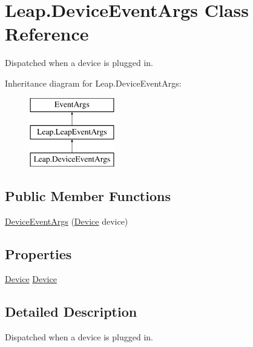 \hypertarget{class_leap_1_1_device_event_args}{}\section{Leap.\+Device\+Event\+Args Class Reference}
\label{class_leap_1_1_device_event_args}


Dispatched when a device is plugged in.  


Inheritance diagram for Leap.\+Device\+Event\+Args\+:\begin{figure}[H]
\begin{center}
\leavevmode
\includegraphics[height=3.000000cm]{class_leap_1_1_device_event_args}
\end{center}
\end{figure}
\subsection*{Public Member Functions}
\begin{DoxyCompactItemize}
\item 
\mbox{\hyperlink{class_leap_1_1_device_event_args_a3c4a894a009ac62e7b804d760aa6f055}{Device\+Event\+Args}} (\mbox{\hyperlink{class_leap_1_1_device}{Device}} device)
\end{DoxyCompactItemize}
\subsection*{Properties}
\begin{DoxyCompactItemize}
\item 
\mbox{\hyperlink{class_leap_1_1_device}{Device}} \mbox{\hyperlink{class_leap_1_1_device_event_args_ad60b9dc8b48025359695a1e4774184bd}{Device}}
\end{DoxyCompactItemize}


\subsection{Detailed Description}
Dispatched when a device is plugged in. 


